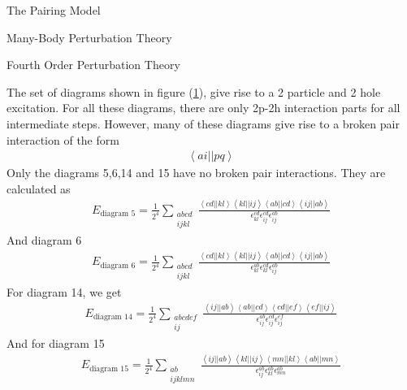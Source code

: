 \documentclass[twoside,english]{uiofysmaster}
\begin{document}
\begin{chapter}{The Pairing Model}
\begin{section}{Many-Body Perturbation Theory}
\begin{subsection}{Fourth Order Perturbation Theory}
\begin{figure}[H]
				\label{figure:mbpt2p2h}
			\end{figure}
			The set of diagrams shown in figure (\ref{figure:mbpt2p2h}), give rise to a 2 particle and 2 hole excitation. For all these diagrams, there are only 2p-2h interaction parts for all intermediate steps. However, many of these diagrams give rise to a broken pair interaction of the form 
			\begin{align}
			 	\left< ai || pq \right> 
			\end{align}
			Only the diagrams 5,6,14 and 15 have no broken pair interactions. They are calculated as
			\begin{align}
				E_{\text{diagram 5}} = \frac{1}{2^4} \sum_{\substack{abcd\\ijkl}} \frac{ \left<cd||kl\right>\left<kl||ij\right>\left<ab||cd\right>\left<ij||ab\right> }{ \epsilon_{kl}^{cd} \epsilon_{ij}^{cd} \epsilon_{ij}^{ab} }
			\end{align} 
			And diagram 6
			\begin{align}
				E_{\text{diagram 6}} = \frac{1}{2^4} \sum_{\substack{abcd\\ijkl}} \frac{ \left<cd||kl\right>\left<kl||ij\right>\left<ab||cd\right>\left<ij||ab\right> }{ \epsilon_{kl}^{ab} \epsilon_{kl}^{cd} \epsilon_{ij}^{ab} }
			\end{align} 
			For diagram 14, we get 
			\begin{align}
				E_{\text{diagram 14}} = \frac{1}{2^4} \sum_{\substack{abcdef\\ij}} \frac{ \left<ij||ab\right>\left<ab||cd\right>\left<cd||ef\right>\left<ef||ij\right> }{ \epsilon_{ij}^{ab} \epsilon_{ij}^{cd} \epsilon_{ij}^{ef} }
			\end{align} 
			And for diagram 15
			\begin{align}
				E_{\text{diagram 15}} = \frac{1}{2^4} \sum_{\substack{ab\\ijklmn}} \frac{ \left<ij||ab\right>\left<kl||ij\right>\left<mn||kl\right>\left<ab||mn\right> }{ \epsilon_{ij}^{ab} \epsilon_{kl}^{ab} \epsilon_{mn}^{ab} }
			\end{align} 


\end{subsection}
\end{section}
\end{chapter}
\end{document}

